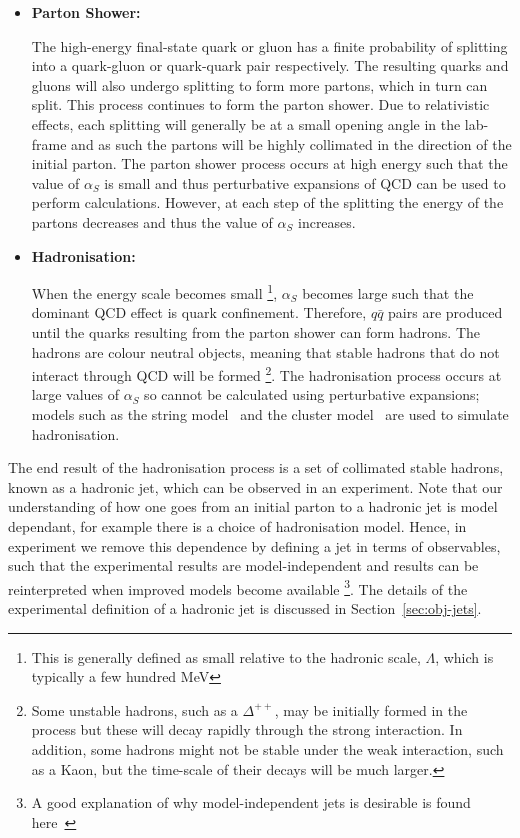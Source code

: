\begin{itemize}[leftmargin=*]
  
\item\textbf{Parton Shower:}

  The high-energy final-state quark or gluon has a finite probability of splitting into a quark-gluon or quark-quark pair respectively.
  The resulting quarks and gluons will also undergo splitting to form more partons,
  which in turn can split. This process continues to form the parton shower.
  Due to relativistic effects, each splitting will generally be at a small opening angle in the lab-frame
  and as such the partons will be highly collimated in the direction of the initial parton.
  The parton shower process occurs at high energy such that the value of $\alpha_S$ is small
  and thus perturbative expansions of QCD can be used to perform calculations.
  However, at each step of the splitting the energy of the partons decreases
  and thus the value of $\alpha_S$ increases.\\
  
\item\textbf{Hadronisation:}
  
  When the energy scale becomes small
  \footnote{This is generally defined as small relative to the hadronic scale, $\Lambda$, which is typically a few hundred MeV},
  $\alpha_S$ becomes large such that the dominant QCD effect is quark confinement.
  Therefore, $q\bar{q}$ pairs are produced until the quarks resulting from the parton shower can form hadrons.
  The hadrons are colour neutral objects, meaning that stable hadrons that do not interact through QCD will be formed
  \footnote{Some unstable hadrons, such as a $\Delta^{++}$, may be initially formed in the process but these will decay rapidly through the strong interaction.
    In addition, some hadrons might not be stable under the weak interaction, such as a Kaon, but the time-scale of their decays will be much larger.}.
  The hadronisation process occurs at large values of $\alpha_S$ so cannot be calculated using perturbative expansions;
  models such as the string model~\cite{theo-qcd_jet_string} and the
  cluster model~\cite{theo-qcd_jet_cluster} are used to simulate hadronisation.

\end{itemize}
  
The end result of the hadronisation process is a set of collimated stable hadrons,
known as a hadronic jet, which can be observed in an experiment.
Note that our understanding of how one goes from an initial parton to a hadronic jet is model dependant,
for example there is a choice of hadronisation model.
Hence, in experiment we remove this dependence by defining a jet in terms of observables,
such that the experimental results are model-independent and results can be reinterpreted when improved models become available
\footnote{A good explanation of why model-independent jets is desirable is found here~\cite{theo-jets_jb}}.
The details of the experimental definition of a hadronic jet is discussed in Section~\ref{sec:obj-jets}.

